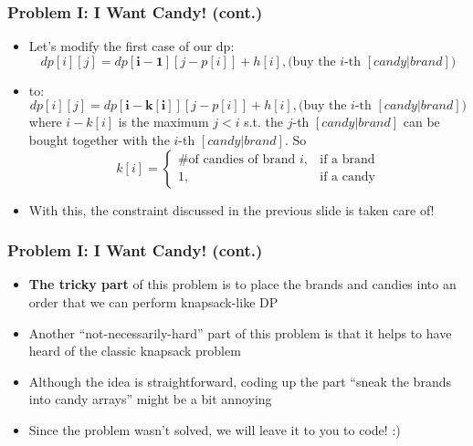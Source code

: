 \begin{frame}
  \frametitle{Problem I: I Want Candy! (cont.)}
  \begin{itemize}
    \item Let's modify the first case of our dp:
      \[dp[i][j] = dp[\boldsymbol{i-1}][j-p[i]] + h[i], \text{(buy the $i$-th $[candy|brand]$)}\]
    \item to:
      \[dp[i][j] = dp[\boldsymbol{i-k[i]}][j-p[i]] + h[i], \text{(buy the $i$-th $[candy|brand]$)}\]
    where $i-k[i]$ is the maximum $j<i$ s.t. the $j$-th $[candy|brand]$ can be bought together with the $i$-th $[candy|brand]$. So
    \[ k[i] = \begin{cases}
      \text{\# of candies of brand $i$}, & \text{if a brand}\\
      1, & \text{if a candy}
    \end{cases}
      \]
    \item With this, the constraint discussed in the previous slide is taken care of!
  \end{itemize}
\end{frame}

\begin{frame}
  \frametitle{Problem I: I Want Candy! (cont.)}
  \begin{itemize}
    \item \textbf{The tricky part} of this problem is to place the brands and candies into an order that we can perform knapsack-like DP 
    \item Another ``not-necessarily-hard'' part of this problem is that it helps to have heard of the classic knapsack problem
    \item Although the idea is straightforward, coding up the part ``sneak the brands into candy arrays'' might be a bit annoying
    \item Since the problem wasn't solved, we will leave it to you to code! :)
  \end{itemize}
\end{frame}
